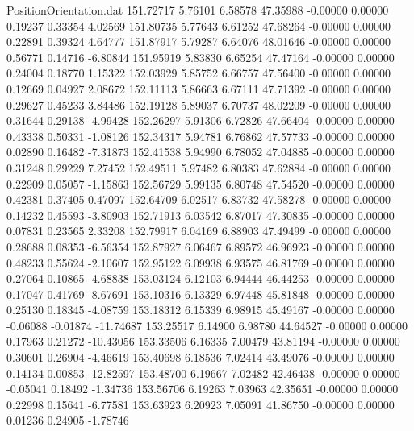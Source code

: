 \begin{filecontents}{PositionOrientation.dat}
 151.72717    5.76101    6.58578    47.35988   -0.00000    0.00000    0.19237    0.33354    4.02569
 151.80735    5.77643    6.61252    47.68264   -0.00000    0.00000    0.22891    0.39324    4.64777
 151.87917    5.79287    6.64076    48.01646   -0.00000    0.00000    0.56771    0.14716   -6.80844
 151.95919    5.83830    6.65254    47.47164   -0.00000    0.00000    0.24004    0.18770    1.15322
 152.03929    5.85752    6.66757    47.56400   -0.00000    0.00000    0.12669    0.04927    2.08672
 152.11113    5.86663    6.67111    47.71392   -0.00000    0.00000    0.29627    0.45233    3.84486
 152.19128    5.89037    6.70737    48.02209   -0.00000    0.00000    0.31644    0.29138   -4.99428
 152.26297    5.91306    6.72826    47.66404   -0.00000    0.00000    0.43338    0.50331   -1.08126
 152.34317    5.94781    6.76862    47.57733   -0.00000    0.00000    0.02890    0.16482   -7.31873
 152.41538    5.94990    6.78052    47.04885   -0.00000    0.00000    0.31248    0.29229    7.27452
 152.49511    5.97482    6.80383    47.62884   -0.00000    0.00000    0.22909    0.05057   -1.15863
 152.56729    5.99135    6.80748    47.54520   -0.00000    0.00000    0.42381    0.37405    0.47097
 152.64709    6.02517    6.83732    47.58278   -0.00000    0.00000    0.14232    0.45593   -3.80903
 152.71913    6.03542    6.87017    47.30835   -0.00000    0.00000    0.07831    0.23565    2.33208
 152.79917    6.04169    6.88903    47.49499   -0.00000    0.00000    0.28688    0.08353   -6.56354
 152.87927    6.06467    6.89572    46.96923   -0.00000    0.00000    0.48233    0.55624   -2.10607
 152.95122    6.09938    6.93575    46.81769   -0.00000    0.00000    0.27064    0.10865   -4.68838
 153.03124    6.12103    6.94444    46.44253   -0.00000    0.00000    0.17047    0.41769   -8.67691
 153.10316    6.13329    6.97448    45.81848   -0.00000    0.00000    0.25130    0.18345   -4.08759
 153.18312    6.15339    6.98915    45.49167   -0.00000    0.00000   -0.06088   -0.01874  -11.74687
 153.25517    6.14900    6.98780    44.64527   -0.00000    0.00000    0.17963    0.21272  -10.43056
 153.33506    6.16335    7.00479    43.81194   -0.00000    0.00000    0.30601    0.26904   -4.46619
 153.40698    6.18536    7.02414    43.49076   -0.00000    0.00000    0.14134    0.00853  -12.82597
 153.48700    6.19667    7.02482    42.46438   -0.00000    0.00000   -0.05041    0.18492   -1.34736
 153.56706    6.19263    7.03963    42.35651   -0.00000    0.00000    0.22998    0.15641   -6.77581
 153.63923    6.20923    7.05091    41.86750   -0.00000    0.00000    0.01236    0.24905   -1.78746

\end{filecontents}
